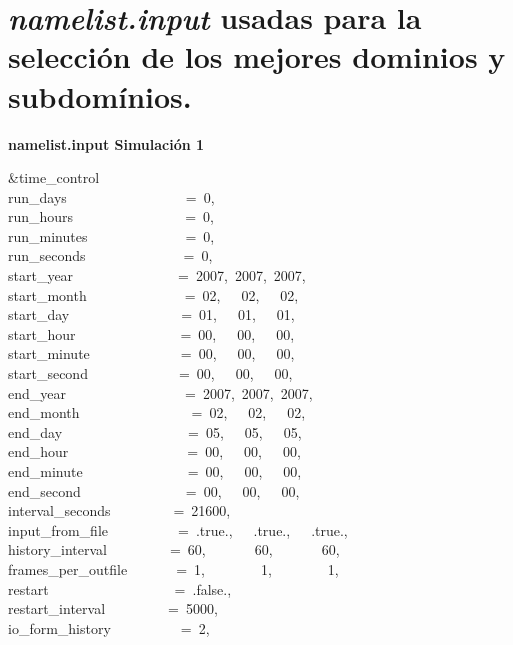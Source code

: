 
\section{\textit{namelist.input} usadas para la selección de los mejores dominios y subdomínios.}



\textbf{namelist.input Simulación 1}

\&time\_control~~~~~~~~~~~~\\
run\_days~~~~~~~~~~~~~~~~~=~0,\\
run\_hours~~~~~~~~~~~~~~~~=~0,\\
run\_minutes~~~~~~~~~~~~~~=~0,\\
run\_seconds~~~~~~~~~~~~~~=~0,\\
start\_year~~~~~~~~~~~~~~~=~2007,~2007,~2007,\\
start\_month~~~~~~~~~~~~~~=~02,~~~02,~~~02,~~\\
start\_day~~~~~~~~~~~~~~~~=~01,~~~01,~~~01,~~\\
start\_hour~~~~~~~~~~~~~~~=~00,~~~00,~~~00,~~\\
start\_minute~~~~~~~~~~~~~=~00,~~~00,~~~00,~~\\
start\_second~~~~~~~~~~~~~=~00,~~~00,~~~00,~~\\
end\_year~~~~~~~~~~~~~~~~~=~2007,~2007,~2007,\\
end\_month~~~~~~~~~~~~~~~~=~02,~~~02,~~~02,~~\\
end\_day~~~~~~~~~~~~~~~~~~=~05,~~~05,~~~05,~~\\
end\_hour~~~~~~~~~~~~~~~~~=~00,~~~00,~~~00,~~\\
end\_minute~~~~~~~~~~~~~~~=~00,~~~00,~~~00,~~\\
end\_second~~~~~~~~~~~~~~~=~00,~~~00,~~~00,~~\\
interval\_seconds~~~~~~~~~=~21600,\\
input\_from\_file~~~~~~~~~~=~.true.,~~~.true.,~~~.true.,\\
history\_interval~~~~~~~~~=~60,~~~~~~~60,~~~~~~~60,\\
frames\_per\_outfile~~~~~~~=~1,~~~~~~~~1,~~~~~~~~1,\\
restart~~~~~~~~~~~~~~~~~~=~.false.,\\
restart\_interval~~~~~~~~~=~5000,\\
io\_form\_history~~~~~~~~~~=~2,\\
